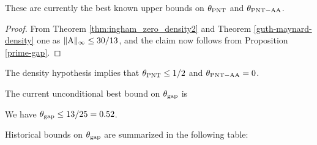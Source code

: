 These are currently the best known upper bounds on $\theta_{\mathrm{PNT}}$ and $\theta_{\mathrm{PNT-AA}}$.

\begin{proof}  From Theorem \ref{thm:ingham_zero_density2} and Theorem \ref{guth-maynard-density} one as $\|\mathrm{A}\|_\infty \leq 30/13$, and the claim now follows from Proposition \ref{prime-gap}.
\end{proof}

\begin{corollary}  The density hypothesis implies that $\theta_{\mathrm{PNT}} \leq 1/2$ and $\theta_{\mathrm{PNT-AA}} = 0$.
\end{corollary}

The current unconditional best bound on $\theta_{\mathrm{gap}}$ is

\begin{theorem}\cite{li_number_2025}\label{bhp-thm} We have $\theta_{\mathrm{gap}} \leq 13/25 = 0.52$.
\end{theorem}

Historical bounds on $\theta_{\mathrm{gap}}$ are summarized in the following table:


